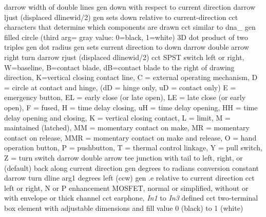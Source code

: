   {darrow}
  {width of double lines}
  {gen}
  {down with respect to current direction}
  {darrow}
  {ljust (displaced dlinewid/2)}
  {gen}
  {sets down relative to current-direction}
  {cct}
  {characters that determine which components are drawn}
  {cct}
  {similar to dna\_}
  {gen}
  {filled circle (third arg= gray value: 0=black, 1=white)}
  {3D}
  {dot product of two triples}
  {gen}
  {dot radius}
  {gen}
  {sets current direction to down}
  {darrow}
  {double arrow right turn}
  {darrow}
  {rjust (displaced dlinewid/2)}
  {cct}
  {SPST switch left or right, W=baseline, B=contact blade,
    dB=contact blade to the right of drawing direction,
         K=vertical closing contact line,
         C = external operating mechanism,
         D = circle at contact and hinge,
             (dD = hinge only, uD = contact only)
         E = emergency button,
         EL = early close
            (or late open),
         LE = late close (or early open),
         F = fused,
         H = time delay closing,
         uH = time delay opening,
         HH = time delay
             opening and closing,
         K = vertical closing contact,
         L = limit,
         M = maintained (latched),
         MM = momentary contact on make,
         MR = momentary contact on release,
         MMR = momentary contact
            on make and release,
         O = hand operation button,
         P = pushbutton,
         T = thermal control linkage,
         Y = pull switch,
         Z = turn switch
   }
  {darrow}
  {double arrow tee junction with tail to left,
   right, or (default) back along current direction }
  {gen}
  {degrees to radians conversion constant}
  {darrow}
  {turn dline arg1 degrees left (ccw)}
  {gen}
  {.e relative to current direction}
  {cct}
  {left or right, N or P enhancement MOSFET, normal
   or simplified, without or with envelope or thick channel }
  {cct}
  {earphone, {\sl In1} to {\sl In3} defined}
  {cct}
  { two-terminal box element with adjustable dimensions and fill
   value 0 (black) to 1 (white) }
